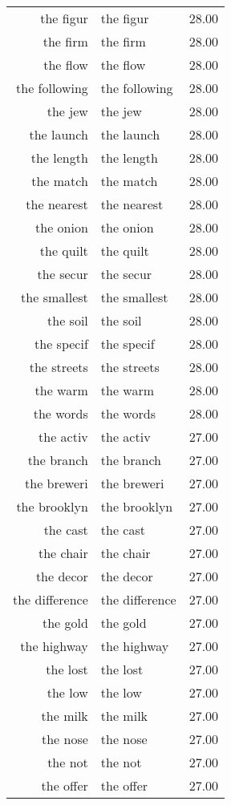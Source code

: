 \begin{table}[ht]
\begin{tabular}{rlr}
  the figur & the figur & 28.00 \\ 
  the firm & the firm & 28.00 \\ 
  the flow & the flow & 28.00 \\ 
  the following & the following & 28.00 \\ 
  the jew & the jew & 28.00 \\ 
  the launch & the launch & 28.00 \\ 
  the length & the length & 28.00 \\ 
  the match & the match & 28.00 \\ 
  the nearest & the nearest & 28.00 \\ 
  the onion & the onion & 28.00 \\ 
  the quilt & the quilt & 28.00 \\ 
  the secur & the secur & 28.00 \\ 
  the smallest & the smallest & 28.00 \\ 
  the soil & the soil & 28.00 \\ 
  the specif & the specif & 28.00 \\ 
  the streets & the streets & 28.00 \\ 
  the warm & the warm & 28.00 \\ 
  the words & the words & 28.00 \\ 
  the activ & the activ & 27.00 \\ 
  the branch & the branch & 27.00 \\ 
  the breweri & the breweri & 27.00 \\ 
  the brooklyn & the brooklyn & 27.00 \\ 
  the cast & the cast & 27.00 \\ 
  the chair & the chair & 27.00 \\ 
  the decor & the decor & 27.00 \\ 
  the difference & the difference & 27.00 \\ 
  the gold & the gold & 27.00 \\ 
  the highway & the highway & 27.00 \\ 
  the lost & the lost & 27.00 \\ 
  the low & the low & 27.00 \\ 
  the milk & the milk & 27.00 \\ 
  the nose & the nose & 27.00 \\ 
  the not & the not & 27.00 \\ 
  the offer & the offer & 27.00 \\ 

\end{tabular}
\end{table}
